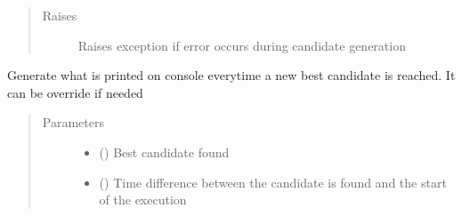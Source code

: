 \documentclass[letterpaper,10pt,english]{sphinxmanual}
\begin{document}
\begin{fulllineitems}
\begin{fulllineitems}
\begin{quote}
\begin{description}
\item[{Raises}] \leavevmode
\sphinxAtStartPar
{} \textendash{} Raises exception if error occurs during candidate generation

\end{description}\end{quote}

\end{fulllineitems}


\begin{fulllineitems}
\label{\detokenize{MolOpt.genetic:MolOpt.genetic.genetic.Genetic.display}}
\sphinxAtStartPar
Generate what is printed on console everytime a new best candidate is reached. It can be override if needed
\begin{quote}\begin{description}
\item[{Parameters}] \leavevmode\begin{itemize}
\item {} 
\sphinxAtStartPar
{} ({\hyperref[\detokenize{MolOpt.genetic:MolOpt.genetic.genetic.Chromosome}]{}}) \textendash{} Best candidate found

\item {} 
\sphinxAtStartPar
{} () \textendash{} Time difference between the candidate is found and the start of the execution

\end{itemize}

\end{description}\end{quote}

\end{fulllineitems}



\end{fulllineitems}
\end{document}
